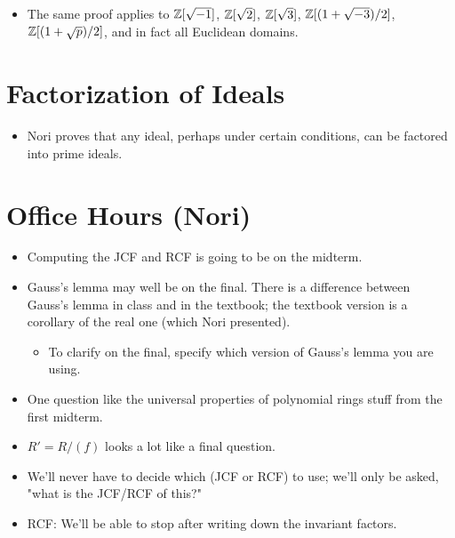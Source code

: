 \documentclass[../notes.tex]{subfiles}
\begin{document}
\begin{itemize}
\begin{proof}
        It follows that $g\in\Z[\sqrt{-1}]$ equals $qf+(fc)$, where $qf\in\Z[\sqrt{-1}]$ and $fc=r\in\Z[\sqrt{-1}]$. Moreover, $N(r)=N(f)N(c)\leq 1/2N(f)$.
    \end{proof}
    \item The same proof applies to $\mathbb{Z}[\sqrt{-1}]$, $\mathbb{Z}[\sqrt{2}]$, $\mathbb{Z}[\sqrt{3}]$, $\mathbb{Z}[(1+\sqrt{-3})/2]$, $\mathbb{Z}[(1+\sqrt{p})/2]$, and in fact all Euclidean domains.
\end{itemize}



\section{Factorization of Ideals}
\begin{itemize}
    \item {}Nori proves that any ideal, perhaps under certain conditions, can be factored into prime ideals.
\end{itemize}



\section{Office Hours (Nori)}
\begin{itemize}
    \item {}Computing the JCF and RCF is going to be on the midterm.
    \item Gauss's lemma may well be on the final. There is a difference between Gauss's lemma in class and in the textbook; the textbook version is a corollary of the real one (which Nori presented).
    \begin{itemize}
        \item To clarify on the final, specify which version of Gauss's lemma you are using.
    \end{itemize}
    \item One question like the universal properties of polynomial rings stuff from the first midterm.
    \item $R'=R/(f)$ looks a lot like a final question.
    \item We'll never have to decide which (JCF or RCF) to use; we'll only be asked, "what is the JCF/RCF of this?"
    \item RCF: We'll be able to stop after writing down the invariant factors.
\end{itemize}
\end{document}
